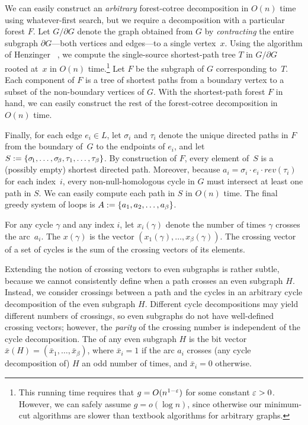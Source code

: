\documentclass[11pt,twoside]{article}
\def\rev{\mathit{rev}}
\begin{document}
We can easily construct an \emph{arbitrary} forest-cotree decomposition in $O(n)$ time using whatever-first search, but we require a decomposition with a particular forest $F$.  Let $G/\partial G$ denote the graph obtained from $G$ by \emph{contracting} the entire subgraph $\partial G$---both vertices and edges---to a single vertex~$x$.  Using the algorithm of Henzinger \etal~\cite{hkrs-fspap-97}, we compute the single-source shortest-path tree $T$ in $G/\partial G$ rooted at~$x$ in $O(n)$ time.\footnote{This running time requires that $g = O(n^{1-\varepsilon})$ for some constant $\varepsilon>0$.  However, we can safely assume $g = o(\log n)$, since otherwise our minimum-cut algorithms are slower than textbook algorithms for arbitrary graphs.}  Let $F$ be the subgraph of $G$ corresponding to~$T$.  Each component of $F$ is a tree of shortest paths from a boundary vertex to a subset of the non-boundary vertices of $G$.  With the shortest-path forest $F$ in hand, we can easily construct the rest of the forest-cotree decomposition in $O(n)$ time.

Finally, for each edge $e_i\in L$, let $\sigma_i$ and $\tau_i$ denote the unique directed paths in $F$ from the boundary of~$G$ to the endpoints of $e_i$, and let $S := \{ \sigma\!_1, \dots, \sigma\!_\beta, \allowbreak \tau_1, \dots, \tau_\beta \}$.  By construction of $F$, every element of~$S$ is a (possibly empty) shortest directed path.  Moreover, because $a_i = \sigma_i \cdot e_i \cdot \rev(\tau_i)$ for each index~$i$, every non-null-homologous cycle in $G$ must intersect at least one path in $S$.  We can easily compute each path in $S$ in $O(n)$ time.  The final greedy system of loops is $A := \{ a_1, a_2, \dots, a_\beta \}$.

For any cycle $\gamma$ and any index $i$, let $x_i(\gamma)$ denote the number of times $\gamma$ crosses the arc~$a_i$.  The  $x(\gamma)$ is the vector $(x_1(\gamma), \dots, x_\beta(\gamma))$.  The crossing vector of a set of cycles is the sum of the crossing vectors of its elements.

Extending the notion of crossing vectors to even subgraphs is rather subtle, because we cannot consistently define when a path crosses an even subgraph $H$.  Instead, we consider crossings between a path and the cycles in an arbitrary cycle decomposition of the even subgraph $H$.  Different cycle decompositions may yield different numbers of crossings, so even subgraphs do not have well-defined crossing vectors; however, the \emph{parity} of the crossing number is independent of the cycle decomposition.  The  of any even subgraph $H$ is the bit vector $\bar{x}(H) = (\bar{x}_1, \dots, \bar{x}_\beta)$, where $\bar{x}_i = 1$ if the arc $a_i$ crosses (any cycle decomposition of) $H$ an odd number of times, and $\bar{x}_i = 0$ otherwise.
\end{document}
